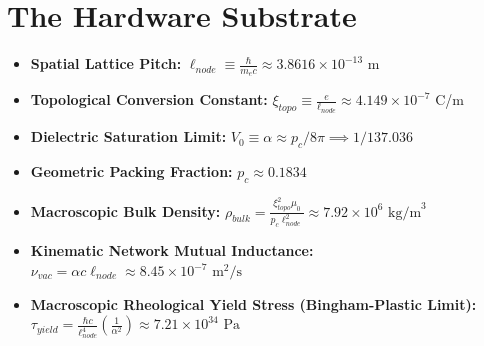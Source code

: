 \section{The Hardware Substrate}
\begin{itemize}
    \item \textbf{Spatial Lattice Pitch:} $\ell_{node} \equiv \frac{\hbar}{m_e c} \approx 3.8616 \times 10^{-13}$ m
    \item \textbf{Topological Conversion Constant:} $\xi_{topo} \equiv \frac{e}{\ell_{node}} \approx 4.149 \times 10^{-7}$ C/m
    \item \textbf{Dielectric Saturation Limit:} $V_0 \equiv \alpha \approx p_c / 8\pi \implies 1/137.036$
    \item \textbf{Geometric Packing Fraction:} $p_c \approx 0.1834$
    \item \textbf{Macroscopic Bulk Density:} $\rho_{bulk} = \frac{\xi_{topo}^2 \mu_0}{p_c \ell_{node}^2} \approx 7.92 \times 10^6 \text{ kg/m}^3$
    \item \textbf{Kinematic Network Mutual Inductance:} $\nu_{vac} = \alpha c \ell_{node} \approx 8.45 \times 10^{-7} \text{ m}^2/\text{s}$
    \item \textbf{Macroscopic Rheological Yield Stress (Bingham-Plastic Limit):} $\tau_{yield} = \frac{\hbar c}{\ell_{node}^4} \left( \frac{1}{\alpha^2} \right) \approx 7.21 \times 10^{34}\text{ Pa}$
\end{itemize}

